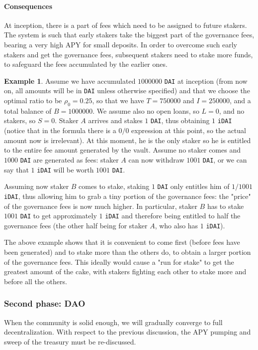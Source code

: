 \documentclass[a4paper,10 pt]{article}
\theoremstyle{definition}
\newtheorem{example}{Example}
\begin{document}
\paragraph{Consequences}
At inception, there is a part of fees which need to be assigned to future stakers. The system is such that early stakers take the biggest part of the governance fees, bearing a very high APY for small deposits. In order to overcome such early stakers and get the governance fees, subsequent stakers need to stake more funds, to safeguard the fees accumulated by the earlier ones.

\begin{example}
Assume we have accumulated $1000000$ \verb|DAI| at inception (from now on, all amounts will be in \verb|DAI| unless otherwise specified) and that we choose the optimal ratio to be $\rho_0 = 0.25$, so that we have $T = 750000$ and $I = 250000$, and a total balance of $B = 1000000$. We assume also no open loans, so $L = 0$, and no stakers, so $S = 0$.
Staker $A$ arrives and stakes $1$ \verb|DAI|, thus obtaining $1$ \verb|iDAI| (notice that in the formula there is a $0/0$ expression at this point, so the actual amount now is irrelevant). At this moment, he is the only staker so he is entitled to the entire fee amount generated by the vault. Assume no staker comes and $1000$ \verb|DAI| are generated as fees: staker $A$ can now withdraw $1001$ \verb|DAI|, or we can say that $1$ \verb|iDAI| will be worth $1001$ \verb|DAI|.

Assuming now staker $B$ comes to stake, staking $1$ \verb|DAI| only entitles him of $1/1001$ \verb|iDAI|, thus allowing him to grab a tiny portion of the governance fees: the "price" of the governance fees is now much higher. In particular, staker $B$ has to stake $1001$ \verb|DAI| to get approximately $1$ \verb|iDAI| and therefore being entitled to half the governance fees (the other half being for staker $A$, who also has $1$ \verb|iDAI|).
\end{example}

The above example shows that it is convenient to come first (before fees have been generated) and to stake more than the others do, to obtain a larger portion of the governance fees. This ideally would cause a "run for stake" to get the greatest amount of the cake, with stakers fighting each other to stake more and before all the others.

\subsubsection{Second phase: DAO}
When the community is solid enough, we will gradually converge to full decentralization. With respect to the previous discussion, the APY pumping and sweep of the treasury must be re-discussed.
\end{document}
